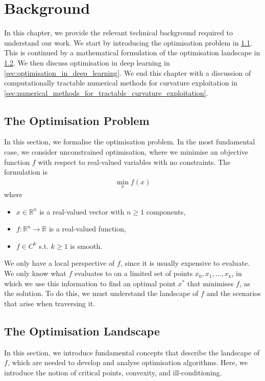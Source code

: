 \chapter{Background}
\label{chap:background}

In this chapter, we provide the relevant technical background required to understand our work. We start by introducing the optimisation problem in \cref{sec:optimisation_problem}. This is continued by a mathematical formulation of the optimisation landscape in \cref{sec:optimisation_landscape}. We then discuss optimisation in deep learning in \cref{sec:optimisation_in_deep_learning}. We end this chapter with a discussion of computationally tractable numerical methods for curvature exploitation in \cref{sec:numerical_methods_for_tractable_curvature_exploitation}.

\section{The Optimisation Problem}
\label{sec:optimisation_problem}

In this section, we formalise the optimisation problem. In the most fundamental case, we consider unconstrained optimisation, where we minimise an objective function $f$ with respect to real-valued variables with no constraints. The formulation is 
\begin{align}
    \min_{x} f(x)
\end{align}
where
\begin{itemize}
    \item $x \in \mathbb{R}^n$ is a real-valued vector with $n \geq 1$ components,
    \item $f: \mathbb{R}^n \to \mathbb{R}$ is a real-valued function,
    \item $f \in C^k$ s.t. $k \geq 1$ is smooth.
\end{itemize}
We only have a local perspective of $f$, since it is usually expensive to evaluate. We only know what $f$ evaluates to on a limited set of points $x_0, x_1, \ldots, x_k$, in which we use this information to find an optimal point $x^*$ that minimises $f$, as the solution. To do this, we must understand the landscape of $f$ and the scenarios that arise when traversing it.

\section{The Optimisation Landscape}
\label{sec:optimisation_landscape}
In this section, we introduce fundamental concepts that describe the landscape of $f$, which are needed to develop and analyse optimisation algorithms. Here, we introduce the notion of critical points, convexity, and ill-conditioning.

